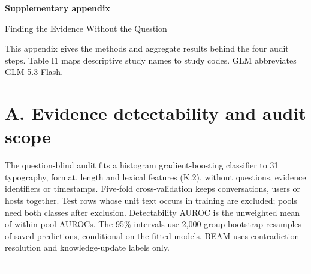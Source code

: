 \documentclass[11pt]{article}
\makeatletter
\newcommand{\KeepTable}[2]{\par\penalty-100\begingroup
  \dimen@ii\pagegoal \advance\dimen@ii-\pagetotal
  \ifdim #1\baselineskip>\dimen@ii
    \ifdim \dimen@ii<0.33\textheight
      \ifdim \dimen@ii>\z@ \vfil\fi \break
    \else
      \ifdim #2\baselineskip>\dimen@ii \ifdim \dimen@ii>\z@ \vfil\fi \break\fi
    \fi
  \fi\endgroup}
\makeatother
\begin{document}
\clearpage
{}
{}
\begin{center}
{\LARGE\bfseries Supplementary appendix}\par\vspace{0.6em}
{\large Finding the Evidence Without the Question}\par
\vspace{0.4em}{\normalsize Özgür Uğurlu}\par
\end{center}
\vspace{0.5em}
This appendix gives the methods and aggregate results behind the four audit steps. Table I1 maps descriptive study names to study codes. GLM abbreviates GLM-5.3-Flash.

\label{appendix-a}

\section{A. Evidence detectability and audit scope}\label{a.-evidence-detectability-and-audit-scope}

The question-blind audit fits a histogram gradient-boosting classifier to 31 typography, format, length and lexical features (K.2), without questions, evidence identifiers or timestamps. Five-fold cross-validation keeps conversations, users or hosts together. Test rows whose unit text occurs in training are excluded; pools need both classes after exclusion. Detectability AUROC is the unweighted mean of within-pool AUROCs. The 95\% intervals use 2,000 group-bootstrap resamples of saved predictions, conditional on the fitted models. BEAM uses contradiction-resolution and knowledge-update labels only.

\KeepTable{16}{0}

\par\begingroup
\small
\end{document}
